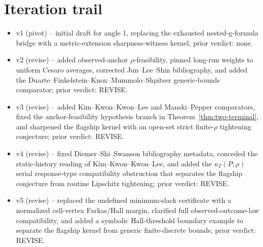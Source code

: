 \documentclass[11pt]{article}
\theoremstyle{definition}
\theoremstyle{plain}
\theoremstyle{remark}
\begin{document}
\section{Iteration trail}
\begin{itemize}[leftmargin=*]
\item v1 (pivot) -- initial draft for angle 1, replacing the exhausted nested-g-formula bridge with a metric-extension sharpness-witness kernel; prior verdict: none.
\item v2 (revise) -- added observed-anchor \(\rho\)-feasibility, pinned long-run weights to uniform Cesaro averages, corrected Jun--Lee--Shin bibliography, and added the Duarte--Finkelstein--Knox--Mummolo--Shpitser generic-bounds comparator; prior verdict: REVISE.
\item v3 (revise) -- added Kim--Kwon--Kwon--Lee and Manski--Pepper comparators, fixed the anchor-feasibility hypothesis branch in Theorem~\ref{thm:two-terminal}, and sharpened the flagship kernel with an open-set strict finite-\(\rho\) tightening conjecture; prior verdict: REVISE.
\item v4 (revise) -- fixed Diemer--Shi--Swanson bibliography metadata, conceded the static-history reading of Kim--Kwon--Kwon--Lee, and added the \(\kappa_T(P;\rho)\) serial response-type compatibility obstruction that separates the flagship conjecture from routine Lipschitz tightening; prior verdict: REVISE.
\item v5 (revise) -- replaced the undefined minimum-slack certificate with a normalized cell-vertex Farkas/Hall margin, clarified full observed-outcome-law compatibility, and added a symbolic Hall-threshold boundary example to separate the flagship kernel from generic finite-discrete bounds; prior verdict: REVISE.
\end{itemize}
\end{document}
